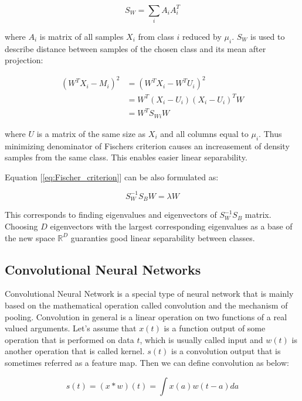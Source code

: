 \documentclass[a4paper, 10 pt, conference]{ieeeconf}
\begin{document}
\begin{equation}
    S_{W} = \sum_{i} A_{i}A_{i}^T
    \label{eq:SW}
\end{equation}

where $A_i$ is matrix of all samples $X_i$ from class $i$ reduced by $\mu_i$. $S_W$ is used to describe distance between samples of the chosen class and its mean after projection:

\begin{align}
    (W^{T} X_i - M_i)^2 &= (W^{T} X_i - W^{T} U_i)^2 \nonumber \\
                        &= W^{T} (X_i - U_i)(X_i - U_i)^T W \\
                        &= W^{T} S_{Wi} W \nonumber
\end{align}

where $U$ is a matrix of the same size as $X_i$ and all columns equal to $\mu_i$. Thus minimizing denominator of Fischers criterion causes an increasement of density samples from the same class. This enables easier linear separability.

Equation [\ref{eq:Fischer_criterion}] can be also formulated as:

\begin{equation}
    S_{W}^{-1} S_{B} W = \lambda W
\end{equation}

This corresponds to finding eigenvalues and eigenvectors of $S_{W}^{-1} S_{B}$ matrix. Choosing $D$ eigenvectors with the largest corresponding eigenvalues as a base of the new space $\mathbb{R}^D$ guaranties good linear separability between classes. 

\subsection{Convolutional Neural Networks}

Convolutional Neural Network is a special type of neural network that is mainly based on the mathematical operation called convolution and the mechanism of pooling. Convolution in general is a linear operation on two functions of a real valued arguments. Let's assume that $x(t)$ is a function output of some operation that is performed on data $t$, which is usually called input and $w(t)$ is another operation that is called kernel. $s(t)$ is a convolution output that is sometimes referred as a feature map. Then we can define convolution as below:

\begin{equation}
    s(t) = (x*w)(t) = \int x(a)w(t-a)da
\end{equation}
\end{document}
